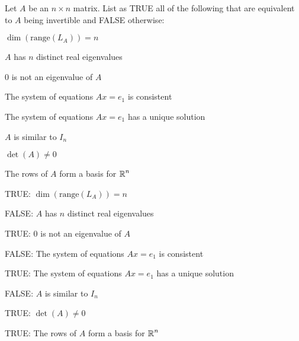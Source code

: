 \documentclass{ximera}
\author{Marty Golubitsky}
\begin{document}
\begin{exercise}\label{c8.2.a2}

Let $A$ be an $n\times n$ matrix. List as TRUE all of the following that are equivalent to $A$ being invertible and FALSE otherwise:
\begin{enumeratea}
\item $\dim(\text{range}(L_A))= n$
\item $A$ has $n$ distinct real eigenvalues
\item $0$ is not an eigenvalue of $A$
\item The system of equations $Ax=e_1$ is consistent
\item The system of equations $Ax=e_1$ has a unique solution
\item $A$ is similar to $I_n$
\item $\det(A)\neq 0$
\item The rows of $A$ form a basis for $\mbox{$\Bbb{R}$}^n$
\end{enumeratea}

  
\begin{solution}

\ans 
\begin{enumeratea}
\item TRUE: $\dim(\text{range}(L_A))= n$
\item FALSE: $A$ has $n$ distinct real eigenvalues
\item TRUE: $0$ is not an eigenvalue of $A$
\item FALSE: The system of equations $Ax=e_1$ is consistent
\item TRUE: The system of equations $Ax=e_1$ has a unique solution
\item FALSE: $A$ is similar to $I_n$
\item TRUE: $\det(A)\neq 0$
\item TRUE: The rows of $A$ form a basis for $\mbox{$\Bbb{R}$}^n$
\end{enumeratea}

\end{solution}
\end{exercise}
\end{document}
